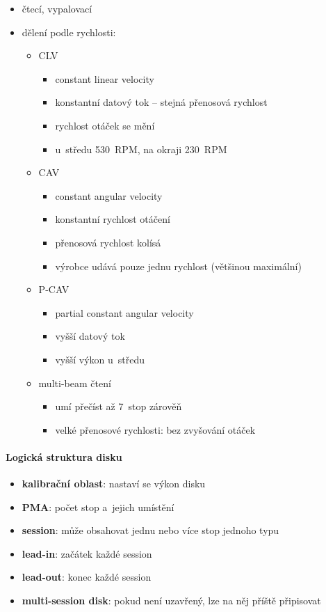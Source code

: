 \documentclass[a4paper,12pt]{article}
\providecommand{\tightlist}{%
\setlength{\itemsep}{0pt}\setlength{\parskip}{0pt}}
\begin{document}
\begin{itemize}
  \tightlist
  \item čtecí, vypalovací
  \item dělení podle rychlosti:
  \begin{itemize}
    \tightlist
    \item CLV
    \begin{itemize}
      \tightlist
      \item constant linear velocity
      \item konstantní datový tok -- stejná přenosová rychlost
      \item rychlost otáček se mění
      \item u~středu 530~RPM, na okraji 230~RPM
    \end{itemize}
    \item CAV
    \begin{itemize}
      \tightlist
      \item constant angular velocity
      \item konstantní rychlost otáčení
      \item přenosová rychlost kolísá
      \item výrobce udává pouze jednu rychlost (většinou maximální)
    \end{itemize}
    \item P-CAV
    \begin{itemize}
      \tightlist
      \item partial constant angular velocity
      \item vyšší datový tok
      \item vyšší výkon u~středu
    \end{itemize}
    \item multi-beam čtení
    \begin{itemize}
      \tightlist
      \item umí přečíst až 7~stop zárověň
      \item velké přenosové rychlosti: bez zvyšování otáček
    \end{itemize}
  \end{itemize}
\end{itemize}

\paragraph{Logická struktura disku}

\begin{itemize}
  \tightlist
  \item \textbf{kalibrační oblast}: nastaví se výkon disku
  \item \textbf{PMA}: počet stop a~jejich umístění
  \item \textbf{session}: může obsahovat jednu nebo více stop jednoho typu
  \item \textbf{lead-in}: začátek každé session
  \item \textbf{lead-out}: konec každé session
  \item \textbf{multi-session disk}: pokud není uzavřený, lze na něj příště
  připisovat
\end{itemize}
\end{document}
